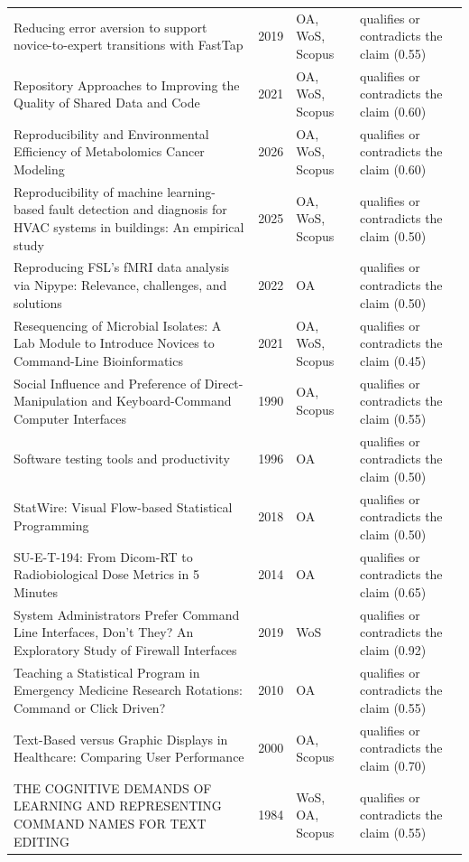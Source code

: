\begin{longtable}{@{}%
  >{\raggedright\arraybackslash}p{}c%
  >{\raggedright\arraybackslash}p{}%
  >{\raggedright\arraybackslash}p{}@{}}
Reducing error aversion to support novice-to-expert transitions with FastTap & 2019 & OA, WoS, Scopus & qualifies or contradicts the claim (0.55) \\
Repository Approaches to Improving the Quality of Shared Data and Code & 2021 & OA, WoS, Scopus & qualifies or contradicts the claim (0.60) \\
Reproducibility and Environmental Efficiency of Metabolomics Cancer Modeling & 2026 & OA, WoS, Scopus & qualifies or contradicts the claim (0.60) \\
Reproducibility of machine learning-based fault detection and diagnosis for HVAC systems in buildings: An empirical study & 2025 & OA, WoS, Scopus & qualifies or contradicts the claim (0.50) \\
Reproducing FSL's fMRI data analysis via Nipype: Relevance, challenges, and solutions & 2022 & OA & qualifies or contradicts the claim (0.50) \\
Resequencing of Microbial Isolates: A Lab Module to Introduce Novices to Command-Line Bioinformatics & 2021 & OA, WoS, Scopus & qualifies or contradicts the claim (0.45) \\
Social Influence and Preference of Direct-Manipulation and Keyboard-Command Computer Interfaces & 1990 & OA, Scopus & qualifies or contradicts the claim (0.55) \\
Software testing tools and productivity & 1996 & OA & qualifies or contradicts the claim (0.50) \\
StatWire: Visual Flow-based Statistical Programming & 2018 & OA & qualifies or contradicts the claim (0.50) \\
SU-E-T-194: From Dicom-RT to Radiobiological Dose Metrics in 5 Minutes & 2014 & OA & qualifies or contradicts the claim (0.65) \\
System Administrators Prefer Command Line Interfaces, Don't They? An Exploratory Study of Firewall Interfaces & 2019 & WoS & qualifies or contradicts the claim (0.92) \\
Teaching a Statistical Program in Emergency Medicine Research Rotations: Command or Click Driven? & 2010 & OA & qualifies or contradicts the claim (0.55) \\
Text-Based versus Graphic Displays in Healthcare: Comparing User Performance & 2000 & OA, Scopus & qualifies or contradicts the claim (0.70) \\
THE COGNITIVE DEMANDS OF LEARNING AND REPRESENTING COMMAND NAMES FOR TEXT EDITING & 1984 & WoS, OA, Scopus & qualifies or contradicts the claim (0.55) \\

\end{longtable}
